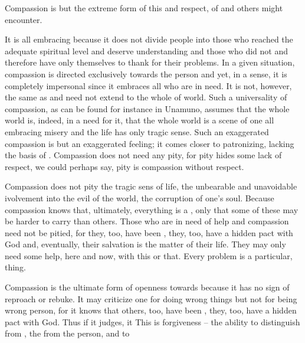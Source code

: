 \subpa Compassion is but the extreme form of this  and
respect, of  and  others might encounter.  

It is all embracing because it does not divide people into those who
reached the adequate spiritual level and deserve understanding and
those who did not and therefore have only themselves to thank for
their problems.  In a given situation, compassion is directed
exclusively towards the person and yet, in a sense, it is completely
impersonal since it embraces all who are in need.  It is not, however,
the same as  and need not extend to the whole of world.  Such
a universality of compassion, as can be found for instance in Unamuno,
assumes that the whole world is, indeed, in a need for it, that the
whole world is a scene of one all embracing misery and the life has
only tragic sense.  Such an exaggerated compassion is but an
exaggerated feeling; it comes closer to patronizing, lacking the basis
of .  Compassion does not need any pity, for pity
hides some lack of respect, we could perhaps say, pity is compassion
without respect.

Compassion does not pity the tragic sens of life, the unbearable
and unavoidable ivolvement into the evil of the world, the corruption
of one's soul.  Because compassion knows that, ultimately, everything
is a , only that some of these  may be harder to
carry than others. Those who are in need of help and compassion need
not be pitied, for they, too, have been , they, too, have a hidden pact
with God and, eventually, their salvation is the matter of 
their life. They may only need some help, here and now, with this or that.
Every problem is a particular,  thing. 

\subpa Compassion is the ultimate form of openness towards  because it has no sign of reproach or rebuke.  It may criticize
one for doing wrong things but not for being wrong person, for it
knows that others, too, have been , they, too, have a hidden
pact with God. Thus if it judges, it  This is forgiveness -- the ability to distinguish  
from , the  from the person, and to 

